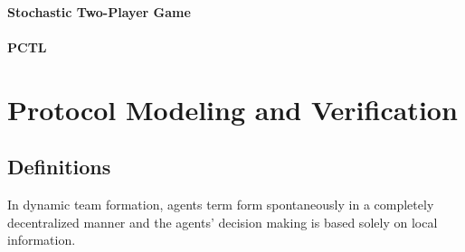 \documentclass{llncs}
\begin{document}

\paragraph{Stochastic Two-Player Game}

\paragraph{PCTL}

\section{Protocol Modeling and Verification}

\subsection{Definitions}

\cite{gaston2005agent}
In dynamic team formation, agents term form spontaneously in a completely decentralized manner and the agents' decision making is based solely on local information.
\end{document}
